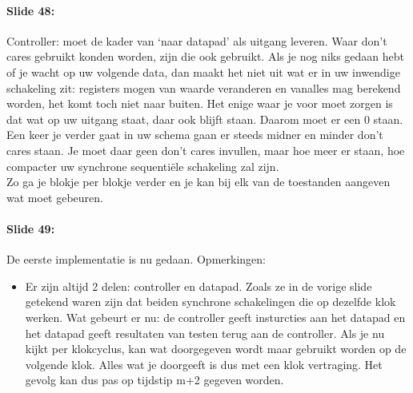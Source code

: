 \documentclass[10pt,a4paper]{book}
\begin{document}
\paragraph{Slide 48:} Controller: moet de kader van `naar datapad' als uitgang leveren. Waar don't cares gebruikt konden worden, zijn die ook gebruikt. Als je nog niks gedaan hebt of je wacht op uw volgende data, dan maakt het niet uit wat er in uw inwendige schakeling zit: registers mogen van waarde veranderen en vanalles mag berekend worden, het komt toch niet naar buiten. Het enige waar je voor moet zorgen is dat wat op uw uitgang staat, daar ook blijft staan. Daarom moet er een 0 staan. Een keer je verder gaat in uw schema gaan er steeds midner en minder don't cares staan. Je moet daar geen don't cares invullen, maar hoe meer er staan, hoe compacter uw synchrone sequenti\"ele schakeling zal zijn.\\
Zo ga je blokje per blokje verder en je kan bij elk van de toestanden aangeven wat moet gebeuren. 

\paragraph{Slide 49:} De eerste implementatie is nu gedaan. Opmerkingen: 
\begin{itemize}
\item Er zijn altijd 2 delen: controller en datapad. Zoals ze in de vorige slide getekend waren zijn dat beiden synchrone schakelingen die op dezelfde klok werken. Wat gebeurt er nu: de controller geeft insturcties aan het datapad en het datapad geeft resultaten van testen terug aan de controller. Als je nu kijkt per klokcyclus, kan wat doorgegeven wordt maar gebruikt worden op de volgende klok. Alles wat je doorgeeft is dus met een klok vertraging. Het gevolg kan dus pas op tijdstip m+2 gegeven worden.
\end{itemize}
\end{document}
